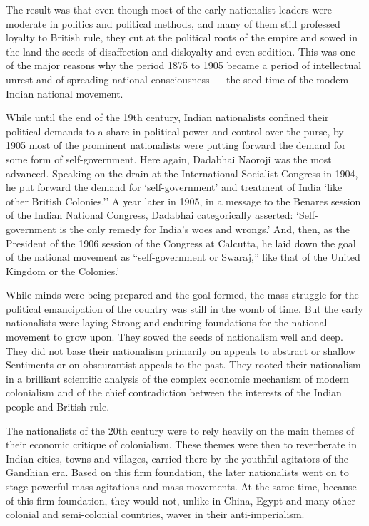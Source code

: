 The result was that even though most of the early nationalist leaders were moderate in politics and political methods, and many of them still professed loyalty to British rule, they cut at the political roots of the empire and sowed in the land the seeds of disaffection and disloyalty and even sedition. This was one of the major reasons why the period 1875 to 1905 became a period of intellectual unrest and of spreading national consciousness --- the seed-time of the modem Indian national movement.

While until the end of the 19th century, Indian nationalists confined their political demands to a share in political power and control over the purse, by 1905 most of the prominent nationalists were putting forward the demand for some form of self-government. Here again, Dadabhai Naoroji was the most advanced. Speaking on the drain at the International Socialist Congress in 1904, he put forward the demand for `self-government' and treatment of India `like other British Colonies.'' A year later in 1905, in a message to the Benares session of the Indian National Congress, Dadabhai categorically asserted: `Self-government is the only remedy for India's woes and wrongs.' And, then, as the President of the 1906 session of the Congress at Calcutta, he laid down the goal of the national movement as ``self-government or Swaraj,'' like that of the United Kingdom or the Colonies.'

While minds were being prepared and the goal formed, the mass struggle for the political emancipation of the country was still in the womb of time. But the early nationalists were laying Strong and enduring foundations for the national movement to grow upon. They sowed the seeds of nationalism well and deep. They did not base their nationalism primarily on appeals to abstract or shallow Sentiments or on obscurantist appeals to the past. They rooted their nationalism in a brilliant scientific analysis of the complex economic mechanism of modern colonialism and of the chief contradiction between the interests of the Indian people and British rule.

The nationalists of the 20th century were to rely heavily on the main themes of their economic critique of colonialism. These themes were then to reverberate in Indian cities, towns and villages, carried there by the youthful agitators of the Gandhian era. Based on this firm foundation, the later nationalists went on to stage powerful mass agitations and mass movements. At the same time, because of this firm foundation, they would not, unlike in China, Egypt and many other colonial and semi-colonial countries, waver in their anti-imperialism.

